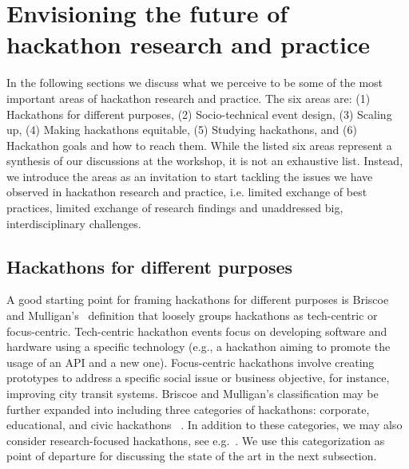 \documentclass{ieeeaccess}
\begin{document}
\section{Envisioning the future of hackathon research and practice}
\label{Vision}
In the following sections we discuss what we perceive to be some of the most important areas of hackathon research and practice.
The six areas are: (1) Hackathons for different purposes, 
(2) Socio-technical event design, 
(3) Scaling up, 
(4) Making hackathons equitable, 
(5) Studying hackathons, and 
(6) Hackathon goals and how to reach them.
While the listed six areas represent a synthesis of our discussions at the workshop, it is not an exhaustive list. 
Instead, we introduce the areas as an invitation to start tackling the issues we have observed in hackathon research and practice, i.e. limited exchange of best practices, limited exchange of research findings and unaddressed big, interdisciplinary challenges.

\subsection{Hackathons for different purposes}
\label{sec:vision:purposes}
A good starting point for framing hackathons for different purposes is Briscoe and Mulligan's~\cite{briscoe2014digital} definition that loosely groups hackathons as tech-centric or focus-centric. 
Tech-centric hackathon events focus on developing software and hardware using a specific technology (e.g., a hackathon aiming to promote the usage of an API and a new one). 
Focus-centric hackathons involve creating prototypes to address a specific social issue or business objective, for instance, improving city transit systems. 
Briscoe and Mulligan's classification may be further expanded into including three categories of hackathons: corporate, educational, and civic hackathons ~\cite{gama2022}.
In addition to these categories, we may also consider research-focused hackathons, see e.g.~\cite{falk202010}.
We use this categorization as point of departure for discussing the state of the art in the next subsection.
\end{document}

